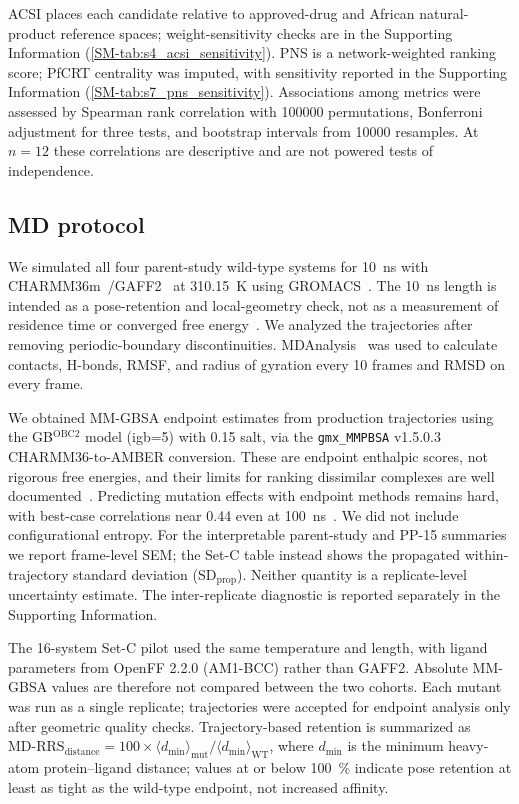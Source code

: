 \documentclass[11pt,a4paper]{article}
\begin{document}
ACSI places each candidate relative to approved-drug and African natural-product reference spaces; weight-sensitivity checks are in the Supporting Information (\cref{SM-tab:s4_acsi_sensitivity}). PNS is a network-weighted ranking score; PfCRT centrality was imputed, with sensitivity reported in the Supporting Information (\cref{SM-tab:s7_pns_sensitivity}). Associations among metrics were assessed by Spearman rank correlation with \num{100000} permutations, Bonferroni adjustment for three tests, and bootstrap intervals from \num{10000} resamples. At $n=\num{12}$ these correlations are descriptive and are not powered tests of independence.

\subsection{MD protocol}

We simulated all four parent-study wild-type systems for \qty{10}{\ns} with CHARMM36m~\citep{charmm36m_2017}/GAFF2~\citep{wang2004gaff} at \qty{310.15}{\kelvin} using GROMACS~\citep{gromacs_2015,lindahl_2024}. The \qty{10}{\ns} length is intended as a pose-retention and local-geometry check, not as a measurement of residence time or converged free energy~\citep{wei2024structure}. We analyzed the trajectories after removing periodic-boundary discontinuities. MDAnalysis~\citep{mdanalysis_2011} was used to calculate contacts, H-bonds, RMSF, and radius of gyration every \num{10} frames and RMSD on every frame.

We obtained MM-GBSA endpoint estimates from production trajectories using the GB$^{\text{OBC2}}$ model (igb=5) with \qty{0.15}{\molar} salt, via the \texttt{gmx\_MMPBSA} v1.5.0.3~\citep{gmx_mmpbsa_2021} CHARMM36-to-AMBER conversion. These are endpoint enthalpic scores, not rigorous free energies, and their limits for ranking dissimilar complexes are well documented~\citep{roux2024mmgbsa}. Predicting mutation effects with endpoint methods remains hard, with best-case correlations near 0.44 even at \qty{100}{\ns}~\citep{yu2022mutation_mmgbsa}. We did not include configurational entropy. For the interpretable parent-study and PP-15 summaries we report frame-level SEM; the Set-C table instead shows the propagated within-trajectory standard deviation (SD$_{\mathrm{prop}}$). Neither quantity is a replicate-level uncertainty estimate. The inter-replicate diagnostic is reported separately in the Supporting Information.

The 16-system Set-C pilot used the same temperature and length, with ligand parameters from OpenFF 2.2.0 (AM1-BCC) rather than GAFF2. Absolute MM-GBSA values are therefore not compared between the two cohorts. Each mutant was run as a single replicate; trajectories were accepted for endpoint analysis only after geometric quality checks. Trajectory-based retention is summarized as $\mathrm{MD\text{-}RRS}_{\mathrm{distance}} = \num{100} \times \langle d_{\min} \rangle_{\mathrm{mut}} / \langle d_{\min} \rangle_{\mathrm{WT}}$, where $d_{\min}$ is the minimum heavy-atom protein--ligand distance; values at or below \qty{100}{\percent} indicate pose retention at least as tight as the wild-type endpoint, not increased affinity.
\end{document}
